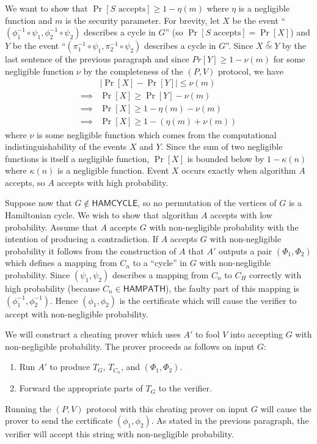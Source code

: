 \documentclass[draft]{article}
\newcommand{\lang}[1]{{\ensuremath{\mathsf{#1}}}}
\newcommand{\cid}{\overset{c}{\simeq}}
\begin{document}
\begin{enumerate}
  We want to show that $\Pr[S\text{ accepts}]\geq 1-\eta(m)$ where $\eta$ is a negligible function and $m$ is the security parameter.
  For brevity, let $X$ be the event ``$(\phi_1^{-1}\circ\psi_1, \phi_2^{-1}\circ\psi_2)$ describes a cycle in $G$'' (so $\Pr[S\text{ accepts}]=\Pr[X]$) and $Y$ be the event ``$(\pi_1^{-1}\circ\psi_1, \pi_2^{-1}\circ\psi_2)$ describes a cycle in $G$''.
  Since $X\cid Y$ by the last sentence of the previous paragraph and since $Pr[Y]\geq 1-\nu(m)$ for some negligible function $\nu$ by the completeness of the $(P, V)$ protocol, we have
  \begin{align*}
    & \left|\Pr[X] - \Pr[Y]\right| \leq \nu(m) \\
    \implies & \Pr[X] \geq \Pr[Y] - \nu(m) \\
    \implies & \Pr[X] \geq 1 - \eta(m) - \nu(m) \\
    \implies & \Pr[X] \geq 1 - (\eta(m) + \nu(m))
  \end{align*}
  where $\nu$ is some negligible function which comes from the computational indistinguishability of the events $X$ and $Y$.
  Since the sum of two negligible functions is itself a negligible function, $\Pr[X]$ is bounded below by $1-\kappa(n)$ where $\kappa(n)$ is a negligible function.
  Event $X$ occurs exactly when algorithm $A$ accepts, so $A$ accepts with high probability.

  Suppose now that $G\notin\lang{HAMCYCLE}$, so no permutation of the vertices of $G$ is a Hamiltonian cycle.
  We wish to show that algorithm $A$ accepts with low probability.
  Assume that $A$ accepts $G$ with non-negligible probability with the intention of producing a contradiction.
  If $A$ accepts $G$ with non-negligible probability it follows from the construction of $A$ that $A'$ outputs a pair $(\Phi_1, \Phi_2)$ which defines a mapping from $C_n$ to a ``cycle'' in $G$ with non-negligible probability.
  Since $(\psi_1, \psi_2)$ describes a mapping from $C_n$ to $C_H$ correctly with high probability (because $C_n\in\lang{HAMPATH}$), the faulty part of this mapping is $(\phi_1^{-1}, \phi_2^{-1})$.
  Hence $(\phi_1, \phi_2)$ is the certificate which will cause the verifier to accept with non-negligible probability.

  We will construct a cheating prover which uses $A'$ to fool $V$ into accepting $G$ with non-negligible probability.
  The prover proceeds as follows on input $G$:
  \begin{enumerate}
  \item
    Run $A'$ to produce $T_G$, $T_{C_n}$, and $(\Phi_1, \Phi_2)$.
  \item Forward the appropriate parts of $T_G$ to the verifier.
  \end{enumerate}
  Running the $(P, V)$ protocol with this cheating prover on input $G$ will cause the prover to send the certificate $(\phi_1, \phi_2)$.
  As stated in the previous paragraph, the verifier will accept this string with non-negligible probability.


\end{enumerate}
\end{document}
